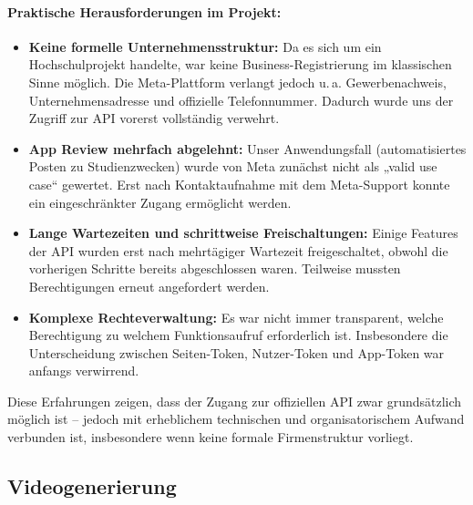 \documentclass[a4paper,12pt]{article}
\begin{document}
\paragraph{Praktische Herausforderungen im Projekt:}
\begin{itemize}
    \item \textbf{Keine formelle Unternehmensstruktur:} Da es sich um ein Hochschulprojekt handelte, war keine Business-Registrierung im klassischen Sinne möglich. Die Meta-Plattform verlangt jedoch u.\,a. Gewerbenachweis, Unternehmensadresse und offizielle Telefonnummer. Dadurch wurde uns der Zugriff zur API vorerst vollständig verwehrt.

    \item \textbf{App Review mehrfach abgelehnt:} Unser Anwendungsfall (automatisiertes Posten zu Studienzwecken) wurde von Meta zunächst nicht als „valid use case“ gewertet. Erst nach Kontaktaufnahme mit dem Meta-Support konnte ein eingeschränkter Zugang ermöglicht werden.

    \item \textbf{Lange Wartezeiten und schrittweise Freischaltungen:} Einige Features der API wurden erst nach mehrtägiger Wartezeit freigeschaltet, obwohl die vorherigen Schritte bereits abgeschlossen waren. Teilweise mussten Berechtigungen erneut angefordert werden.

    \item \textbf{Komplexe Rechteverwaltung:} Es war nicht immer transparent, welche Berechtigung zu welchem Funktionsaufruf erforderlich ist. Insbesondere die Unterscheidung zwischen Seiten-Token, Nutzer-Token und App-Token war anfangs verwirrend.
\end{itemize}

Diese Erfahrungen zeigen, dass der Zugang zur offiziellen API zwar grundsätzlich möglich ist – jedoch mit erheblichem technischen und organisatorischem Aufwand verbunden ist, insbesondere wenn keine formale Firmenstruktur vorliegt.


\subsection{Videogenerierung}
\end{document}
